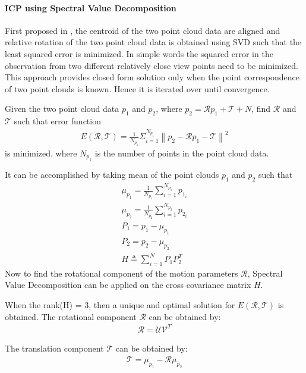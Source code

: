 \paragraph{ICP using Spectral Value Decomposition}
First proposed in \cite{KS.Arun}, the centroid of the two point cloud data are aligned and relative rotation of the two point cloud data is obtained using SVD such that the least squared error is minimized. In simple words the squared error in the observation from two different relatively close view points need to be minimized. This approach provides closed form solution only when the point correspondence of two point clouds is known. Hence it is iterated over until convergence.
\par
Given the two point cloud data $p_1$ and $p_2$, where $p_2 = \mathcal{R} p_1 + \mathcal{T} + N$, find $\mathcal{R}$ and $\mathcal{T}$ such that error function
\begin{gather} \label{ICP-error}
    E(\mathcal{R}, \mathcal{T}) = \frac{1}{N_{p_1}}  \Sigma_{i=1}^{N_{p_1}}\left\lVert p_2 - \mathcal{R} p_1 -\mathcal{T} \right\rVert^2 
\end{gather}
is minimized.
where $N_{p_1}$ is the number of points in the point cloud data.

It can be accomplished by taking mean of the point clouds $p_{1}$ and $p_{2}$ such that
\begin{gather} \label{ICP}
            \mu_{p_1} = \frac{1}{N_{p_1}} \sum\limits_{i=1}^{N_{p_1}} p_{1_i}\\
            \mu_{p_2} = \frac{1}{N_{p_2}}  \sum\limits_{i=1}^{N_{p_2}} p_{2_i}\\
            P_{1} = p_{1} - \mu_{p_{1}}\\
            P_{2} = p_{2} - \mu_{p_{2}}\\
            H  \triangleq  \sum\limits_{i=1}^{N} P_{1} P_{2}^{T}
\end{gather}
Now to find the rotational component of the motion parameters $\mathcal{R}$, Spectral Value Decomposition can be applied on the cross covariance matrix $H$.

When the rank(H) = 3, then a unique and optimal solution for $E(\mathcal{R}, \mathcal{T})$ is obtained. The rotational component $\mathcal{R}$ can be obtained by:
\begin{gather} 
\mathcal{R} = \mathcal{U} \mathcal{V}^T
\end{gather}

The translation component $\mathcal{T}$ can be obtained by:
\begin{gather}
\mathcal{T} = \mu_{p_1} - \mathcal{R}\mu_{p_2}
\end{gather}

